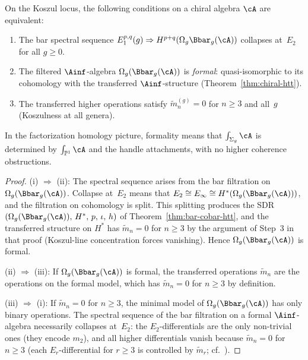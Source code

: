 \begin{proposition}
\label{prop:e2-collapse-formality}
On the Koszul locus, the following conditions on a chiral algebra
$\cA$ are equivalent:
\begin{enumerate}[label=(\roman*)]
\item The bar spectral sequence
$E_1^{p,q}(g) \Rightarrow H^{p+q}(\Omega_g\Bbar_g(\cA))$
collapses at~$E_2$ for all $g \geq 0$.
\item The filtered $\Ainf$-algebra $\Omega_g(\Bbar_g(\cA))$ is
\emph{formal}: quasi-isomorphic to its cohomology with the
transferred $\Ainf$-structure
(Theorem~\textup{\ref{thm:chiral-htt}}).
\item The transferred higher operations satisfy
$\tilde{m}_n^{(g)} = 0$ for $n \geq 3$ and all~$g$
(Koszulness at all genera).
\end{enumerate}
In the factorization homology picture, formality means that
$\int_{\Sigma_g}\cA$ is determined by $\int_{\mathbb{P}^1}\cA$
and the handle attachments, with no higher coherence obstructions.
\end{proposition}

\begin{proof}
(i) $\Rightarrow$ (ii): The spectral sequence arises from the bar
filtration on $\Omega_g(\Bbar_g(\cA))$.  Collapse at~$E_2$ means
that $E_2 \cong E_\infty \cong H^*(\Omega_g(\Bbar_g(\cA)))$,
and the filtration on cohomology is split.  This splitting produces
the SDR $(\Omega_g(\Bbar_g(\cA)),\, H^*,\, p,\, \iota,\, h)$
of Theorem~\ref{thm:bar-cobar-htt}, and the transferred structure
on $H^*$ has $\tilde{m}_n = 0$ for $n \geq 3$ by the argument of
Step~3 in that proof (Koszul-line concentration forces vanishing).
Hence $\Omega_g(\Bbar_g(\cA))$ is formal.

(ii) $\Rightarrow$ (iii): If $\Omega_g(\Bbar_g(\cA))$ is formal,
the transferred operations $\tilde{m}_n$ are the operations on the
formal model, which has $\tilde{m}_n = 0$ for $n \geq 3$ by
definition.

(iii) $\Rightarrow$ (i): If $\tilde{m}_n = 0$ for $n \geq 3$,
the minimal model of $\Omega_g(\Bbar_g(\cA))$ has only binary
operations.  The spectral sequence of the bar filtration on a
formal $\Ainf$-algebra necessarily collapses at~$E_2$:
the $E_2$-differentials are the only non-trivial ones
(they encode $m_2$), and all higher differentials vanish because
$\tilde{m}_n = 0$ for $n \geq 3$
(each $E_r$-differential for $r \geq 3$ is controlled by
$\tilde{m}_r$; cf.\ \cite[Theorem~3.4.1]{LV12}).
\end{proof}

